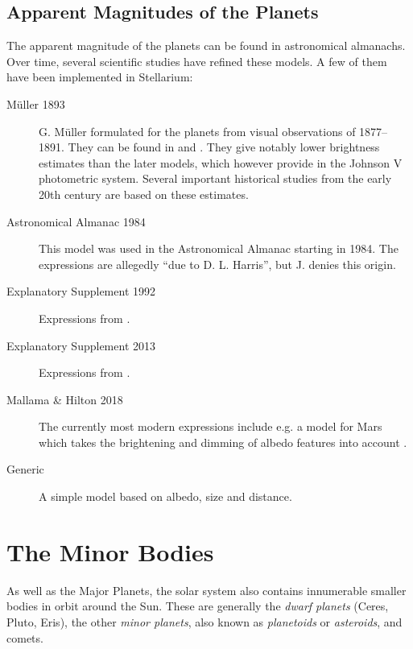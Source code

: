 \subsection{Apparent Magnitudes of the Planets}
The apparent magnitude of the planets can be found in astronomical
almanachs. Over time, several scientific studies have refined these
models. A few of them have been implemented in Stellarium:
\begin{description}
\item[M\"uller 1893] G. M\"uller formulated
   for the
  planets from visual observations of 1877--1891. They can be found in
  \citet{AstronomicalAlgorithms:1998} and \citet{ESAE:1961}. They give 
  notably lower brightness estimates than the later models, which however 
  provide 
  in the Johnson V photometric system. Several important 
  historical studies from the early 20th century are based on these estimates.
\item[Astronomical Almanac 1984] This model was used in the
  Astronomical Almanac starting in 1984. The expressions are allegedly
  ``due to D. L.  Harris'', but J.
  \citet[p.286]{AstronomicalAlgorithms:1998} denies this origin. 
\item[Explanatory Supplement 1992] Expressions from \citet{ESAA:1992}.
\item[Explanatory Supplement 2013] Expressions from \citet{ESAA:2013}.
\item[Mallama \& Hilton 2018] The currently most modern expressions
  include e.g. a model for Mars which takes the brightening and
  dimming of albedo features into account \citep{Mallama:2018}.
\item[Generic] A simple model based on albedo, size and distance.
\end{description}

\section{The Minor Bodies}%

As well as the Major Planets, the solar system also contains
innumerable smaller bodies in orbit around the Sun. These are
generally the \emph{dwarf planets} (Ceres, Pluto, Eris), the other
\emph{minor planets}, also known as \emph{planetoids} or
\emph{asteroids}, and comets.

